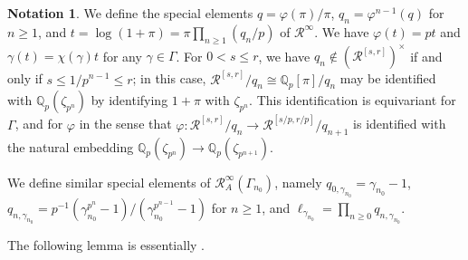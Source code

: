 \documentclass[12pt]{article}
\theoremstyle{definition}
\newtheorem{notation}[theorem]{Notation}
\numberwithin{equation}{theorem}
\newcommand{\calR}{\mathcal{R}}
\newcommand{\QQ}{\mathbb{Q}}
\def\Qp{\QQ_p}
\begin{document}
\begin{notation}
We define the special elements $q = \varphi(\pi)/\pi$, $q_n =
\varphi^{n-1}(q)$ for $n \geq 1$, and $t = \log(1+\pi) =
\pi\prod_{n\geq 1} (q_n/p)$ of $\calR^\infty$.  We have $\varphi(t) =
pt$ and $\gamma(t) = \chi(\gamma)t$ for any $\gamma \in \Gamma$.  For
$0<s\leq r$, we have $q_n \notin (\calR^{[s,r]})^\times$ if and only
if $s \leq 1/p^{n-1}\leq r$; in this case, $\calR^{[s,r]} / q_n \cong
\Qp[\pi]/q_n$ may be identified with $\Qp(\zeta_{p^n})$ by identifying
$1+\pi$ with $\zeta_{p^n}$.  This identification is equivariant for
$\Gamma$, and for $\varphi$ in the sense that $\varphi: \calR^{[s,r]}
/ q_n \to \calR^{[s/p,r/p]} / q_{n+1}$ is identified with the natural
embedding $\Qp(\zeta_{p^n}) \to \Qp(\zeta_{p^{n+1}})$.

We define similar special elements of $\calR_A^\infty(\Gamma_{n_0})$,
namely $q_{0, \gamma_{n_0}} =\gamma_{n_0}-1$, $q_{n, \gamma_{n_0}} =
p^{-1}(\gamma_{n_0}^{p^n}-1)/ (\gamma_{n_0}^{p^{n-1}}-1)$ for $n
\geq1$, and $\ell_{\gamma_{n_0}} = \prod_{n \geq 0} q_{n,
  \gamma_{n_0}}$.
\end{notation}

The following lemma is essentially \cite[Proposition~2.16]{colmez}.
\end{document}

